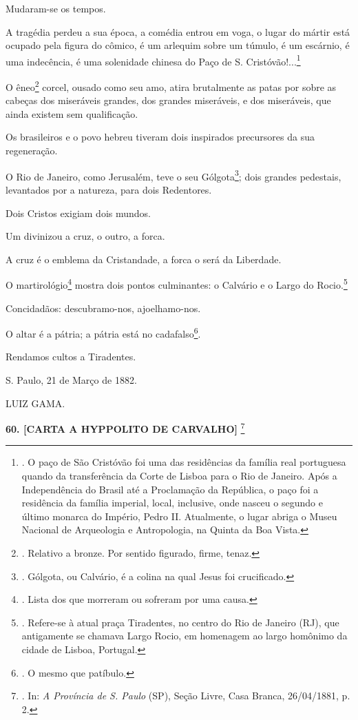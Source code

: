Mudaram-se os tempos.

A tragédia perdeu a sua época, a comédia entrou em voga, o lugar do
mártir está ocupado pela figura do cômico, é um arlequim sobre um
túmulo, é um escárnio, é uma indecência, é uma solenidade chinesa do
Paço de S. Cristóvão!...\footnote{. O paço de São Cristóvão foi uma das
  residências da família real portuguesa quando da transferência da
  Corte de Lisboa para o Rio de Janeiro. Após a Independência do Brasil
  até a Proclamação da República, o paço foi a residência da família
  imperial, local, inclusive, onde nasceu o segundo e último monarca do
  Império, Pedro II. Atualmente, o lugar abriga o Museu Nacional de
  Arqueologia e Antropologia, na Quinta da Boa Vista.}

O êneo\footnote{. Relativo a bronze. Por sentido figurado, firme, tenaz.}
corcel, ousado como seu amo, atira brutalmente as patas por sobre as
cabeças dos miseráveis grandes, dos grandes miseráveis, e dos
miseráveis, que ainda existem sem qualificação.

Os brasileiros e o povo hebreu tiveram dois inspirados precursores da
sua regeneração.

O Rio de Janeiro, como Jerusalém, teve o seu Gólgota\footnote{. Gólgota,
  ou Calvário, é a colina na qual Jesus foi crucificado.}; dois grandes
pedestais, levantados por a natureza, para dois Redentores.

Dois Cristos exigiam dois mundos.

Um divinizou a cruz, o outro, a forca.

A cruz é o emblema da Cristandade, a forca o será da Liberdade.

O martirológio\footnote{. Lista dos que morreram ou sofreram por uma
  causa.} mostra dois pontos culminantes: o Calvário e o Largo do
Rocio.\footnote{. Refere-se à atual praça Tiradentes, no centro do Rio
  de Janeiro (RJ), que antigamente se chamava Largo Rocio, em homenagem
  ao largo homônimo da cidade de Lisboa, Portugal.}

Concidadãos: descubramo-nos, ajoelhamo-nos.

O altar é a pátria; a pátria está no cadafalso\footnote{. O mesmo que
  patíbulo.}.

Rendamos cultos a
Tiradentes.

S. Paulo, 21 de Março de 1882.

LUIZ GAMA.

\textbf{60. {[}CARTA A HYPPOLITO DE CARVALHO{]}} \footnote{. In: \emph{A
  Província de S. Paulo} (SP), Seção Livre, Casa Branca, 26/04/1881, p.
  2.}

